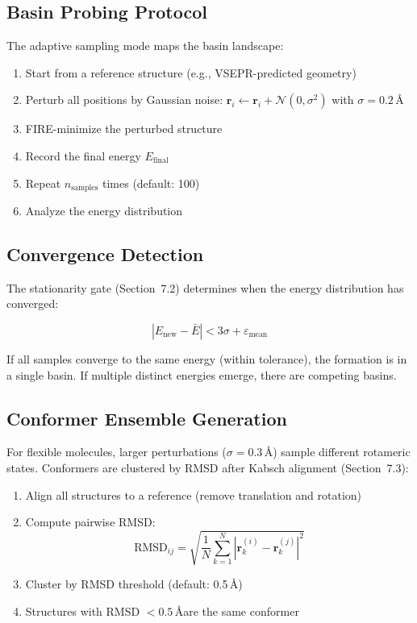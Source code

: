 \documentclass[11pt]{article}
\begin{document}
\subsection{Basin Probing Protocol}

The adaptive sampling mode maps the basin landscape:

\begin{enumerate}
\item Start from a reference structure (e.g., VSEPR-predicted geometry)
\item Perturb all positions by Gaussian noise: $\mathbf{r}_i \gets \mathbf{r}_i + \mathcal{N}(0, \sigma^2)$ with $\sigma = 0.2$\,\AA
\item FIRE-minimize the perturbed structure
\item Record the final energy $E_{\text{final}}$
\item Repeat $n_{\text{samples}}$ times (default: 100)
\item Analyze the energy distribution
\end{enumerate}

\subsection{Convergence Detection}

The stationarity gate (Section~7.2) determines when the energy distribution has converged:

\begin{equation}
|E_{\text{new}} - \bar{E}| < 3\sigma + \varepsilon_{\text{mean}}
\end{equation}

If all samples converge to the same energy (within tolerance), the formation is in a single basin. If multiple distinct energies emerge, there are competing basins.

\subsection{Conformer Ensemble Generation}

For flexible molecules, larger perturbations ($\sigma = 0.3$\,\AA) sample different rotameric states. Conformers are clustered by RMSD after Kabsch alignment (Section~7.3):

\begin{enumerate}
\item Align all structures to a reference (remove translation and rotation)
\item Compute pairwise RMSD:
\begin{equation}
\text{RMSD}_{ij} = \sqrt{\frac{1}{N}\sum_{k=1}^{N} |\mathbf{r}_k^{(i)} - \mathbf{r}_k^{(j)}|^2}
\end{equation}
\item Cluster by RMSD threshold (default: 0.5\,\AA)
\item Structures with RMSD $< 0.5$\,\AA are the same conformer
\end{enumerate}
\end{document}
